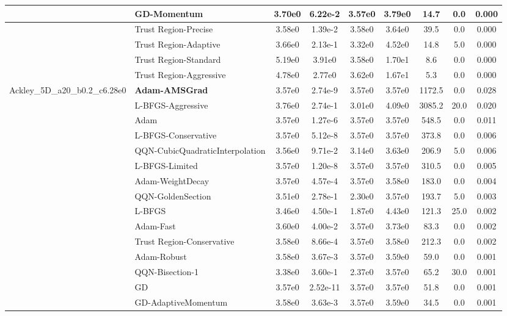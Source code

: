 \documentclass{article}
\begin{document}
\begin{longtable}{|l|l|c|c|c|c|c|c|c|}
\hline
 & GD-Momentum & 3.70e0 & 6.22e-2 & 3.57e0 & 3.79e0 & 14.7 & 0.0 & 0.000 \\
\hline
 & Trust Region-Precise & 3.58e0 & 1.39e-2 & 3.58e0 & 3.64e0 & 39.5 & 0.0 & 0.000 \\
\hline
 & Trust Region-Adaptive & 3.66e0 & 2.13e-1 & 3.32e0 & 4.52e0 & 14.8 & 5.0 & 0.000 \\
\hline
 & Trust Region-Standard & 5.19e0 & 3.91e0 & 3.58e0 & 1.70e1 & 8.6 & 0.0 & 0.000 \\
\hline
 & Trust Region-Aggressive & 4.78e0 & 2.77e0 & 3.62e0 & 1.67e1 & 5.3 & 0.0 & 0.000 \\
Ackley\_5D\_a20\_b0.2\_c6.28e0 & \textbf{Adam-AMSGrad} & 3.57e0 & 2.74e-9 & 3.57e0 & 3.57e0 & 1172.5 & 0.0 & 0.028 \\
\hline
 & L-BFGS-Aggressive & 3.76e0 & 2.74e-1 & 3.01e0 & 4.09e0 & 3085.2 & 20.0 & 0.020 \\
\hline
 & Adam & 3.57e0 & 1.27e-6 & 3.57e0 & 3.57e0 & 548.5 & 0.0 & 0.011 \\
\hline
 & L-BFGS-Conservative & 3.57e0 & 5.12e-8 & 3.57e0 & 3.57e0 & 373.8 & 0.0 & 0.006 \\
\hline
 & QQN-CubicQuadraticInterpolation & 3.56e0 & 9.71e-2 & 3.14e0 & 3.63e0 & 206.9 & 5.0 & 0.006 \\
\hline
 & L-BFGS-Limited & 3.57e0 & 1.20e-8 & 3.57e0 & 3.57e0 & 310.5 & 0.0 & 0.005 \\
\hline
 & Adam-WeightDecay & 3.57e0 & 4.57e-4 & 3.57e0 & 3.58e0 & 183.0 & 0.0 & 0.004 \\
\hline
 & QQN-GoldenSection & 3.51e0 & 2.78e-1 & 2.30e0 & 3.57e0 & 193.7 & 5.0 & 0.003 \\
\hline
 & L-BFGS & 3.46e0 & 4.50e-1 & 1.87e0 & 4.43e0 & 121.3 & 25.0 & 0.002 \\
\hline
 & Adam-Fast & 3.60e0 & 4.00e-2 & 3.57e0 & 3.73e0 & 83.3 & 0.0 & 0.002 \\
\hline
 & Trust Region-Conservative & 3.58e0 & 8.66e-4 & 3.57e0 & 3.58e0 & 212.3 & 0.0 & 0.002 \\
\hline
 & Adam-Robust & 3.58e0 & 3.67e-3 & 3.57e0 & 3.59e0 & 59.0 & 0.0 & 0.001 \\
\hline
 & QQN-Bisection-1 & 3.38e0 & 3.60e-1 & 2.37e0 & 3.57e0 & 65.2 & 30.0 & 0.001 \\
\hline
 & GD & 3.57e0 & 2.52e-11 & 3.57e0 & 3.57e0 & 51.8 & 0.0 & 0.001 \\
\hline
 & GD-AdaptiveMomentum & 3.58e0 & 3.63e-3 & 3.57e0 & 3.59e0 & 34.5 & 0.0 & 0.001 \\
\hline

\end{longtable}
\end{document}
